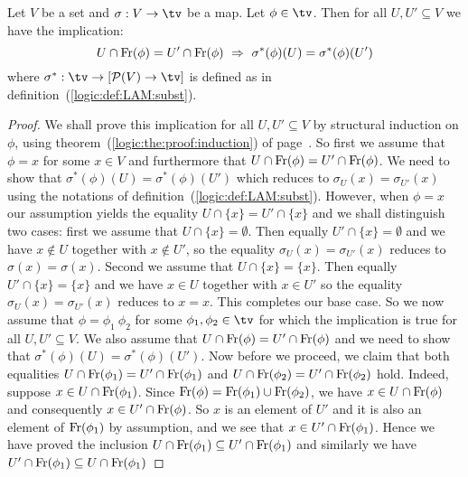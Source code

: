 \begin{prop}\label{logic:prop:LAM:freevar:beta:intersect:gen}
    Let $V$ be a set and $\sigma:V\to\tv$ be a map. Let $\phi\in\tv$.
    Then for all $U,U'\subseteq V$ we have the implication:
        \[
            U\cap\free(\phi) = U'\cap\free(\phi)
            \ \Rightarrow\ 
            \sigma^{*}(\phi)(U) = \sigma^{*}(\phi)(U')
        \]
    where $\sigma^{*}:\tv\to[{\cal P}(V)\to\tv]$ is defined as in 
    definition~(\ref{logic:def:LAM:subst}).
\end{prop}
\begin{proof}
    We shall prove this implication for all $U,U'\subseteq V$  by structural 
    induction on $\phi$, using theorem~(\ref{logic:the:proof:induction}) of 
    page~\pageref{logic:the:proof:induction}. So first we assume that $\phi=x$
    for some $x\in V$ and furthermore that $U\cap\mbox{\rm Fr}(\phi) = U'\cap\mbox{\rm Fr}(\phi)$.
    We need to show that $\sigma^{*}(\phi)(U)=\sigma^{*}(\phi)(U')$ which 
    reduces to $\sigma_{U}(x)=\sigma_{U'}(x)$ using the notations of
    definition~(\ref{logic:def:LAM:subst}). However, when $\phi=x$ our assumption
    yields the equality $U\cap\{x\}=U'\cap\{x\}$ and we shall distinguish two
    cases: first we assume that $U\cap\{x\}=\emptyset$. Then equally 
    $U'\cap\{x\}=\emptyset$ and we have $x\not\in U$ together with $x\not\in U'$,
    so the equality $\sigma_{U}(x)=\sigma_{U'}(x)$ reduces to 
    $\sigma(x)=\sigma(x)$. Second we assume that $U\cap\{x\}=\{x\}$. Then
    equally $U'\cap\{x\}=\{x\}$ and we have $x\in U$ together with $x\in U'$
    so the equality $\sigma_{U}(x)=\sigma_{U'}(x)$ reduces to $x = x$.
    This completes our base case. So we now assume that $\phi=\phi_{1}\ \phi_{2}$
    for some $\phi_{1}, \phi_{2}\in\tv$ for which the implication is true for
    all $U,U'\subseteq V$. We also assume that 
    $U\cap\mbox{\rm Fr}(\phi)=U'\cap\mbox{\rm Fr}(\phi)$
    and we need to show that $\sigma^{*}(\phi)(U)=\sigma^{*}(\phi)(U')$. Now
    before we proceed, we claim that both equalities 
    $U\cap\mbox{\rm Fr}(\phi_{1})=U'\cap\mbox{\rm Fr}(\phi_{1})$ and 
    $U\cap\mbox{\rm Fr}(\phi_{2})=U'\cap\mbox{\rm Fr}(\phi_{2})$ hold. Indeed, suppose
    $x\in U\cap\mbox{\rm Fr}(\phi_{1})$. Since 
    $\mbox{\rm Fr}(\phi)=\mbox{\rm Fr}(\phi_{1})\cup\mbox{\rm Fr}(\phi_{2})$, we have 
    $x\in U\cap\mbox{\rm Fr}(\phi)$ and consequently $x\in U'\cap\mbox{\rm Fr}(\phi)$.
    So $x$ is an element of $U'$ and it is also an element of $\mbox{\rm Fr}(\phi_{1})$
    by assumption, and we see that $x\in U'\cap\mbox{\rm Fr}(\phi_{1})$. Hence we have
    proved the inclusion $U\cap\mbox{\rm Fr}(\phi_{1})\subseteq U'\cap\mbox{\rm Fr}(\phi_{1})$
    and similarly we have $U'\cap\mbox{\rm Fr}(\phi_{1})\subseteq U\cap\mbox{\rm Fr}(\phi_{1})$

\end{proof}
